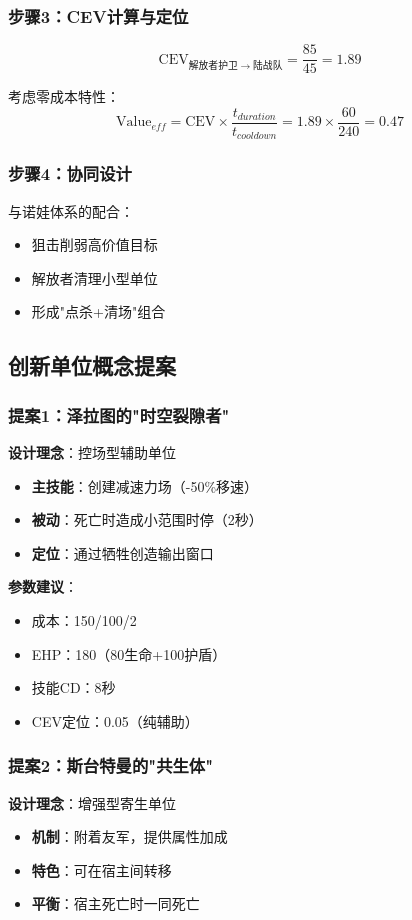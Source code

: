 \documentclass[a4paper,12pt]{article}
\begin{document}
\subsubsection{步骤3：CEV计算与定位}
\begin{equation}
\text{CEV}_{解放者护卫 \rightarrow 陆战队} = \frac{85}{45} = 1.89
\end{equation}

考虑零成本特性：
\begin{equation}
\text{Value}_{eff} = \text{CEV} \times \frac{t_{duration}}{t_{cooldown}} = 1.89 \times \frac{60}{240} = 0.47
\end{equation}

\subsubsection{步骤4：协同设计}
与诺娃体系的配合：
\begin{itemize}
\item 狙击削弱高价值目标
\item 解放者清理小型单位
\item 形成"点杀+清场"组合
\end{itemize}

\subsection{创新单位概念提案}

\subsubsection{提案1：泽拉图的"时空裂隙者"}
\textbf{设计理念}：控场型辅助单位
\begin{itemize}
\item \textbf{主技能}：创建减速力场（-50\%移速）
\item \textbf{被动}：死亡时造成小范围时停（2秒）
\item \textbf{定位}：通过牺牲创造输出窗口
\end{itemize}

\textbf{参数建议}：
\begin{itemize}
\item 成本：150/100/2
\item EHP：180（80生命+100护盾）
\item 技能CD：8秒
\item CEV定位：0.05（纯辅助）
\end{itemize}

\subsubsection{提案2：斯台特曼的"共生体"}
\textbf{设计理念}：增强型寄生单位
\begin{itemize}
\item \textbf{机制}：附着友军，提供属性加成
\item \textbf{特色}：可在宿主间转移
\item \textbf{平衡}：宿主死亡时一同死亡
\end{itemize}
\end{document}
